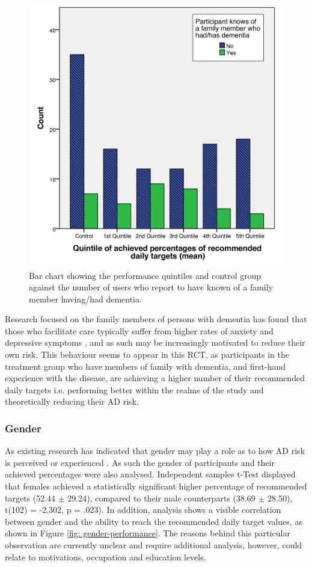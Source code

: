 \begin{figure}[h]
	\centering
    \includegraphics[scale=0.18, angle=0]{Files/prevention-study-3/figures/family-quintile}
  	\caption{Bar chart showing the performance quintiles and control group against the number of users who report to have known of a family member having/had dementia.}
    \label{fig: family-quintile}
\end{figure}

Research focused on the family members of persons with dementia has found that those who facilitate care typically suffer from higher rates of anxiety and depressive symptoms \cite{Mahoney2005}, and as such may be increasingly motivated to reduce their own risk. This behaviour seems to appear in this RCT, as participants in the treatment group who have members of family with dementia, and first-hand experience with the disease, are achieving a higher number of their recommended daily targets i.e. performing better within the realms of the study and theoretically reducing their AD risk.

\subsubsection{Gender}
As existing research has indicated that gender may play a role as to how AD risk is perceived or experienced \cite{Rose-Rego1998, Thompson2004}. As such the gender of participants and their achieved percentages were also analysed. Independent samples t-Test displayed that females achieved a statistically significant higher percentage of recommended targets (52.44 $\pm$ 29.24), compared to their male counterparts (38.69 $\pm$ 28.50), t(102) = -2.302, p = .023). In addition, analysis shows a visible correlation between gender and the ability to reach the recommended daily target values, as shown in Figure \ref{fig: gender-performance}. The reasons behind this particular observation are currently unclear and require additional analysis, however, could relate to motivations, occupation and education levels.

